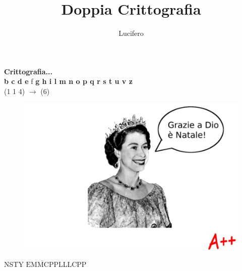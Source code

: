 \documentclass{article}
\title{Doppia Crittografia}
\author{Lucifero}
\date{}
\begin{document}
\maketitle
\thispagestyle{empty}
\begin{center}
\large{\textbf{Crittografia...\\}}
\vspace{.3cm}
 \textbf{b c d e} f \textbf{g h i l m n o p q r s t u v z}\\
(1 1 4) $\rightarrow$ (6)

\end{center}



\begin{center}
\begin{figure}[H]
\centering
\includegraphics[width=1\columnwidth]{finalqueen.pdf}
\end{figure}
\large{NSTY $\overline{\text{EMMCPP}}$LLLCPP}
\end{center}
\end{document}

